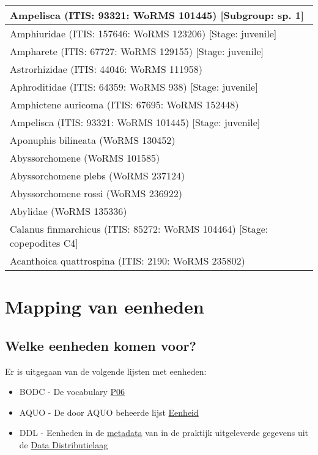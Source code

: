 \documentclass[
]{book}
\providecommand{\tightlist}{%
  \setlength{\itemsep}{0pt}\setlength{\parskip}{0pt}}
\begin{document}
\begin{tabular}[t]{l}
\hline
Ampelisca (ITIS: 93321: WoRMS 101445) [Subgroup: sp. 1]\\
\hline
Amphiuridae (ITIS: 157646: WoRMS 123206) [Stage: juvenile]\\
\hline
Ampharete (ITIS: 67727: WoRMS 129155) [Stage: juvenile]\\
\hline
Astrorhizidae (ITIS: 44046: WoRMS 111958)\\
\hline
Aphroditidae (ITIS: 64359: WoRMS 938) [Stage: juvenile]\\
\hline
Amphictene auricoma (ITIS: 67695: WoRMS 152448)\\
\hline
Ampelisca (ITIS: 93321: WoRMS 101445) [Stage: juvenile]\\
\hline
Aponuphis bilineata (WoRMS 130452)\\
\hline
Abyssorchomene (WoRMS 101585)\\
\hline
Abyssorchomene plebs (WoRMS 237124)\\
\hline
Abyssorchomene rossi (WoRMS 236922)\\
\hline
Abylidae (WoRMS 135336)\\
\hline
Calanus finmarchicus (ITIS: 85272: WoRMS 104464) [Stage: copepodites C4]\\
\hline
Acanthoica quattrospina (ITIS: 2190: WoRMS 235802)\\
\hline
\end{tabular}

\hypertarget{mapping-van-eenheden}{%
\chapter{Mapping van eenheden}\label{mapping-van-eenheden}}

\hypertarget{welke-eenheden-komen-voor}{%
\section{Welke eenheden komen voor?}\label{welke-eenheden-komen-voor}}

Er is uitgegaan van de volgende lijsten met eenheden:

\begin{itemize}
\tightlist
\item
  BODC - De vocabulary \href{https://vocab.nerc.ac.uk/search_nvs/P06/}{P06}
\item
  AQUO - De door AQUO beheerde lijst \href{https://www.aquo.nl/index.php/Id-04f4f467-021b-4218-baa8-9742ed977c61}{Eenheid}
\item
  DDL - Eenheden in de \href{(https://rijkswaterstaat.github.io/wm-ws-dl/\#ophalencatalogus)}{metadata} van in de praktijk uitgeleverde gegevens uit de \href{https://rijkswaterstaat.github.io/wm-ws-dl/\#introduction}{Data Distributielaag}
\end{itemize}
\end{document}
